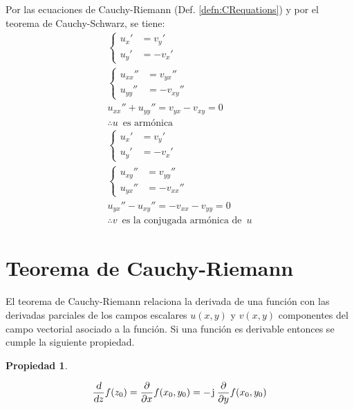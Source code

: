 \documentclass[a5paper,12pt,twoside]{book}
\newtheorem{prop}{{Propiedad}}[chapter]
\begin{document}
Por las ecuaciones de Cauchy-Riemann (Def. \ref{defn:CRequations}) y por el teorema de Cauchy-Schwarz, se tiene:
\begin{gather*}
    \left\{
    \begin{aligned}
        u_x' &= v_y'
        \\
        u_y' &= -v_x'
    \end{aligned}
    \right.
    \\[1ex]
    \left\{
    \begin{aligned}
        u_{xx}'' &= v_{yx}''
        \\
        u_{yy}'' &= -v_{xy}''
    \end{aligned}
    \right.
    \\[1ex]
    u_{xx}'' + u_{yy}''= v_{yx} - v_{xy} = 0
    \\
    \therefore u \enspace \textrm{es armónica}
    \\[1ex]
    \left\{
    \begin{aligned}
        u_x' &= v_y'
        \\
        u_y' &= -v_x'
    \end{aligned}
    \right.
    \\[1ex]
    \left\{
    \begin{aligned}
        u_{xy}'' &= v_{yy}''
        \\
        u_{yx}'' &= - v_{xx}''
    \end{aligned}
    \right.
    \\[1ex]
    u_{yx}'' - u_{xy}'' = - v_{xx} - v_{yy} = 0
    \\
    \therefore v \enspace \textrm{es la conjugada armónica de} \enspace u
\end{gather*}


\section{Teorema de Cauchy-Riemann}

El teorema de Cauchy-Riemann relaciona la derivada de una función con las derivadas parciales de los campos escalares $u(x,y)$ y $v(x,y)$ componentes del campo vectorial asociado a la función.
Si una función es derivable entonces se cumple la siguiente propiedad.

\begin{mdframed}[style=PropertyFrame]
    \begin{prop}
        \label{prop:CRtheorem}
    \end{prop}
    \begin{equation*}
        \frac{\textsl{d}}{\textsl{d} z} f(z_0)= \frac{\partial}{\partial x} f(x_0,y_0)= -\mkern2mu\mathrm{j}\mkern1mu \, \frac{\partial}{\partial y} f(x_0,y_0)
    \end{equation*}
\end{mdframed}
\end{document}
